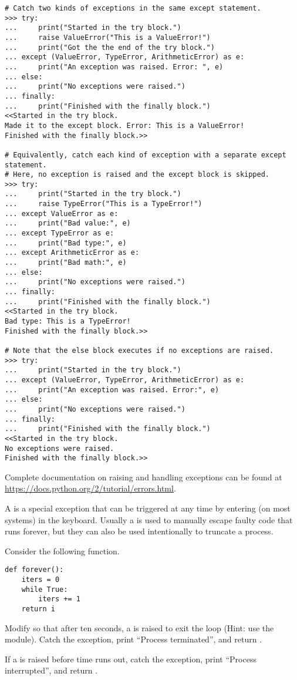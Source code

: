 \begin{lstlisting}
# Catch two kinds of exceptions in the same except statement.
>>> try:
...     print("Started in the try block.")
...     raise ValueError("This is a ValueError!")
...     print("Got the the end of the try block.")
... except (ValueError, TypeError, ArithmeticError) as e:
...     print("An exception was raised. Error: ", e)
... else:
...     print("No exceptions were raised.")
... finally:
...     print("Finished with the finally block.")
<<Started in the try block.
Made it to the except block. Error: This is a ValueError!
Finished with the finally block.>>

# Equivalently, catch each kind of exception with a separate except statement.
# Here, no exception is raised and the except block is skipped.
>>> try:
...     print("Started in the try block.")
...     raise TypeError("This is a TypeError!")
... except ValueError as e:
...     print("Bad value:", e)
... except TypeError as e:
...     print("Bad type:", e)
... except ArithmeticError as e:
...     print("Bad math:", e)
... else:
...     print("No exceptions were raised.")
... finally:
...     print("Finished with the finally block.")
<<Started in the try block.
Bad type: This is a TypeError!
Finished with the finally block.>>

# Note that the else block executes if no exceptions are raised.
>>> try:
...     print("Started in the try block.")
... except (ValueError, TypeError, ArithmeticError) as e:
...     print("An exception was raised. Error:", e)
... else:
...     print("No exceptions were raised.")
... finally:
...     print("Finished with the finally block.")
<<Started in the try block.
No exceptions were raised.
Finished with the finally block.>>
\end{lstlisting}

Complete documentation on raising and handling exceptions can be found at \url{https://docs.python.org/2/tutorial/errors.html}.


\begin{problem}
A  is a special exception that can be triggered at any time by entering  (on most systems) in the keyboard.
Usually a  is used to manually escape faulty code that runs forever, but they can also be used intentionally to truncate a process.

Consider the following function.
\begin{lstlisting}
def forever():
    iters = 0
    while True:
        iters += 1
    return i
\end{lstlisting}
Modify  so that after ten seconds, a  is raised to exit the loop (Hint: use the  module).
Catch the exception, print ``Process terminated'', and return .

If a  is raised before time runs out, catch the exception, print ``Process interrupted'', and return .
\end{problem}

